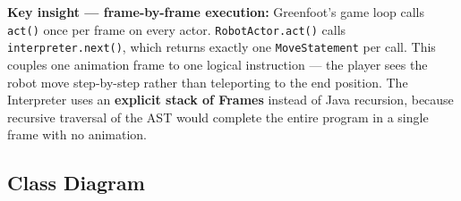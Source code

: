 \documentclass[12pt,a4paper]{article}
\begin{document}
\begin{center}
\end{center}

\vspace{6pt}
\textbf{Key insight — frame-by-frame execution:} Greenfoot's game loop calls \texttt{act()} once per frame on every actor. \texttt{RobotActor.act()} calls \texttt{interpreter.next()}, which returns exactly one \texttt{MoveStatement} per call. This couples one animation frame to one logical instruction — the player sees the robot move step-by-step rather than teleporting to the end position. The Interpreter uses an \textbf{explicit stack of Frames} instead of Java recursion, because recursive traversal of the AST would complete the entire program in a single frame with no animation.

\subsection{Class Diagram}
\end{document}
